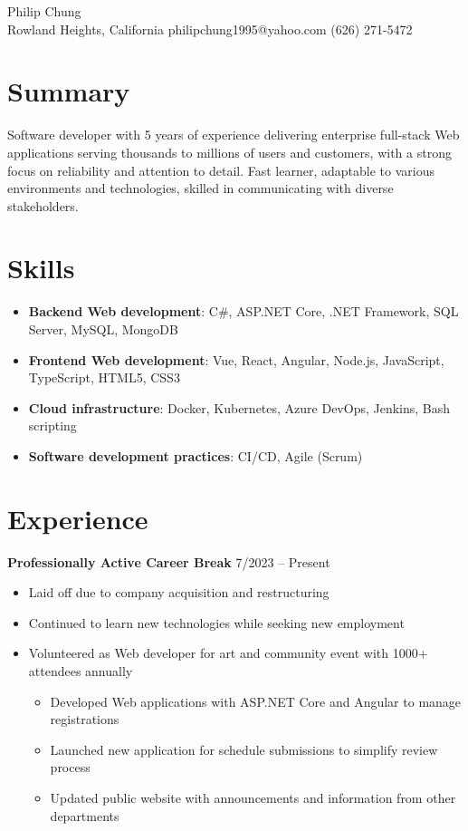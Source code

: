 \documentclass[12pt]{article}
\newcommand{\titleheader}[2]{\textbf{#1} \hfill #2}
\begin{document}
	\begin{center}
		{\headerfont\fontsize{24pt}{24pt}\selectfont Philip Chung} \\ \vspace{0.5em}
		Rowland Heights, California  philipchung1995@yahoo.com  (626) 271-5472
	\end{center}

	\section*{Summary}

	Software developer with 5 years of experience delivering enterprise full-stack Web applications serving thousands to millions of users and customers, with a strong focus on reliability and attention to detail. Fast learner, adaptable to various environments and technologies, skilled in communicating with diverse stakeholders.

	\section*{Skills}

	\newcommand{\skillitem}[2]{\item \textbf{#1}: #2}

	\begin{itemize}[left=0.25in .. 0.25in,label={},itemindent=-0.25in]
		\skillitem{Backend Web development}{C\#, ASP.NET Core, .NET Framework, SQL Server, MySQL, MongoDB}
		\skillitem{Frontend Web development}{Vue, React, Angular, Node.js, JavaScript, TypeScript, HTML5, CSS3}
		\skillitem{Cloud infrastructure}{Docker, Kubernetes, Azure DevOps, Jenkins, Bash scripting}
		\skillitem{Software development practices}{CI/CD, Agile (Scrum)}
	\end{itemize}

	\section*{Experience}

	\titleheader{Professionally Active Career Break}{7/2023 -- Present}

	\begin{itemize}
		\item Laid off due to company acquisition and restructuring
		\item Continued to learn new technologies while seeking new employment
		\item Volunteered as Web developer for art and community event with 1000+ attendees annually
		\begin{itemize}[left=0.125in .. 0.25in]
			\item Developed Web applications with ASP.NET Core and Angular to manage registrations
			\item Launched new application for schedule submissions to simplify review process
			\item Updated public website with announcements and information from other departments
		\end{itemize}
	\end{itemize}
\end{document}
